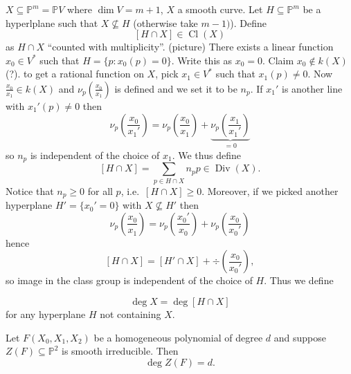 \documentclass[a4paper]{article}
\DeclareMathOperator{\Cl}{Cl}
\renewcommand*{\P}{\mathbb{P}}
\DeclareMathOperator{\Div}{Div} %
\begin{document}
\(X \subseteq \P^m = \P V\) where \(\dim V = m + 1\), \(X\) a smooth curve. Let \(H \subseteq \P^m\) be a hyperlplane such that \(X \nsubseteq H\) (otherwise take \(m - 1)\)). Define
\[
  [H \cap X] \in \Cl(X)
\]
as \(H \cap X\) ``counted with multiplicity''. (picture) There exists a linear function \(x_0 \in V^*\) such that \(H = \{p: x_0(p) = 0\}\). Write this as \(x_0 = 0\). Claim \(x_0 \notin k(X)\) (?). to get a rational function on \(X\), pick \(x_1 \in V^*\) such that \(x_1(p) \neq 0\). Now \(\frac{x_0}{x_1} \in k(X)\) and \(\nu_p(\frac{x_0}{x_1})\) is defined and we set it to be \(n_p\). If \(x_1'\) is another line with \(x_1'(p) \neq 0\) then
\[
  \nu_p(\frac{x_0}{x_1'}) = \nu_p(\frac{x_0}{x_1}) + \underbrace{\nu_p(\frac{x_1}{x_1'})}_{= 0}
\]
so \(n_p\) is independent of the choice of \(x_1\). We thus define
\[
  [H \cap X] = \sum_{p \in H \cap X} n_p p \in \Div(X).
\]
Notice that \(n_p \geq 0\) for all \(p\), i.e.\ \([H \cap X] \geq 0\). Moreover, if we picked another hyperplane \(H' = \{x_0' = 0\}\) with \(X \nsubseteq H'\) then
\[
  \nu_p(\frac{x_0}{x_1}) = \nu_p(\frac{x_0'}{x_0}) + \nu_p(\frac{x_0}{x_0'})
\]
hence
\[
  [H \cap X] = [H' \cap X] + \div (\frac{x_0}{x_0'}),
\]
so image in the class group is independent of the choice of \(H\). Thus we define
\begin{definition}
  \[
    \deg X = \deg [H \cap X]
  \]
  for any hyperplane \(H\) not containing \(X\).
\end{definition}

\begin{theorem}
  Let \(F(X_0, X_1, X_2)\) be a homogeneous polynomial of degree \(d\) and suppose \(Z(F) \subseteq \P^2\) is smooth irreducible. Then
  \[
    \deg Z(F) = d.
  \]
\end{theorem}
\end{document}
